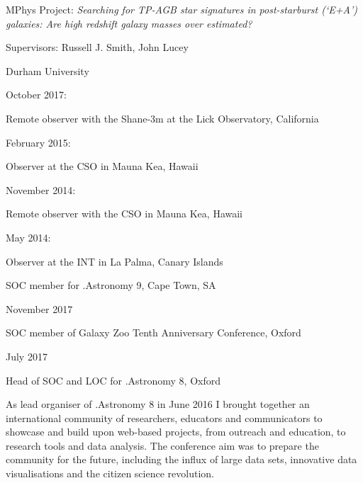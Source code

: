 \documentclass{article}
\begin{document}
\hangindent=30pt \indent\indent MPhys Project: \emph{Searching for TP-AGB star signatures in post-starburst (`E+A') galaxies: Are high redshift galaxy masses over estimated?}

\indent\indent\indent Supervisors: Russell J. Smith, John Lucey

\indent\indent\indent Durham University

\noindent\makebox[\linewidth]{\rule{0.85\paperwidth}{0.2pt}}

\smallskip

\indent October 2017:

\indent \indent Remote observer with the Shane-3m at the Lick Observatory, California 

\indent February 2015:

\indent \indent Observer at the CSO in Mauna Kea, Hawaii

\smallskip

\indent November 2014:

\indent \indent Remote observer with the CSO in Mauna Kea, Hawaii

\smallskip

\indent May 2014:

\indent \indent Observer at the INT in La Palma, Canary Islands

\noindent\makebox[\linewidth]{\rule{0.85\paperwidth}{0.2pt}}

\smallskip

\indent SOC member for .Astronomy 9, Cape Town, SA

\indent \indent November 2017

\indent SOC member of Galaxy Zoo Tenth Anniversary Conference, Oxford

\indent \indent July 2017

\smallskip

\indent Head of SOC and LOC for .Astronomy 8, Oxford

\hangindent=30pt \indent \indent  As lead organiser of .Astronomy 8 in June 2016 I brought together an international community of researchers, educators and communicators to showcase and build upon web-based projects, from outreach and education, to research tools and data analysis. The conference aim was to prepare the community for the future, including the influx of large data sets, innovative data visualisations and the citizen science revolution.

\smallskip
\end{document}
